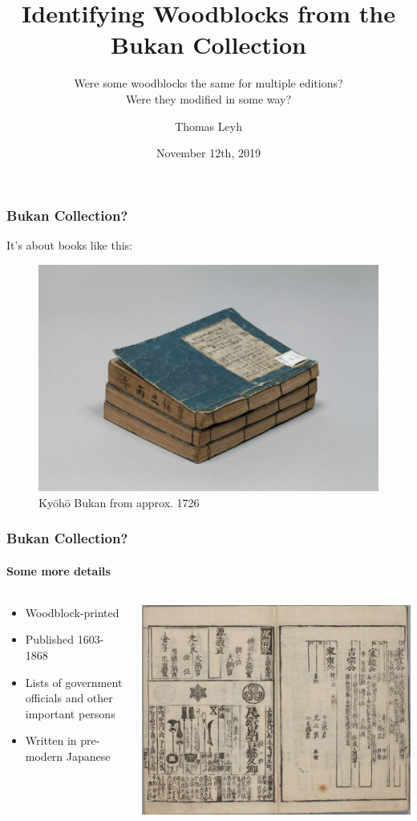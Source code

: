 \documentclass{beamer}
\title[Identifying Woodblocks]{Identifying Woodblocks from the Bukan Collection}
\subtitle{Were some woodblocks the same for multiple editions?\\Were they
  modified in some way?}
\author{Thomas Leyh}
\institute[]{University of Freiburg, Germany}
\date{November 12th, 2019}
\begin{document}
  \begin{frame}
    \titlepage
  \end{frame}

  \begin{frame}
    \frametitle{Bukan Collection?}
    It's about books like this:
    \hspace{1ex}
    \begin{figure}
      \includegraphics[width=0.7\linewidth]{200018769_00001}
      \caption{Kyōhō Bukan from approx. 1726}
    \end{figure}
  \end{frame}

  \begin{frame}
    \frametitle{Bukan Collection?}
    \framesubtitle{Some more details}
    \begin{columns}
      \begin{column}{.4\linewidth}
        \begin{itemize}
        \item Woodblock-printed
        \item Published 1603-1868
        \item Lists of government officials and other important persons
        \item Written in \alert{pre-modern Japanese}
        \end{itemize}
      \end{column}
      \begin{column}{.6\linewidth}
        \includegraphics[width=1.0\linewidth]{200018769_00006}
      \end{column}
    \end{columns}
  \end{frame}
\end{document}
